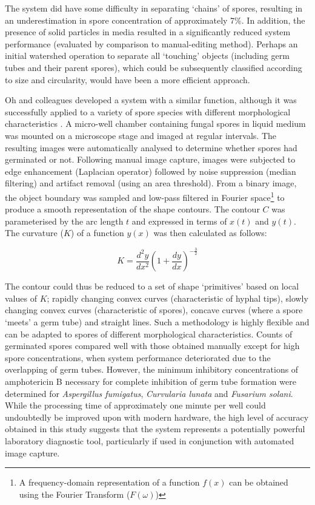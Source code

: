 The system did have some difficulty in separating \lq chains' of spores, resulting in an underestimation in spore concentration of approximately 7\%. In addition, the presence of solid particles in media resulted in a significantly reduced system performance (evaluated by comparison to manual-editing method). Perhaps an initial watershed operation to separate all \lq touching' objects (including germ tubes and their parent spores), which could be subsequently classified according to size and circularity, would have been a more efficient approach.

Oh and colleagues developed a system with a similar function, although it was successfully applied to a variety of spore species with different morphological characteristics \cite{oh1996}. A micro-well chamber containing fungal spores in liquid medium was mounted on a microscope stage and imaged at regular intervals. The resulting images were automatically analysed to determine whether spores had germinated or not. Following manual image capture, images were subjected to edge enhancement (Laplacian operator) followed by noise suppression (median filtering) and artifact removal (using an area threshold). From a binary image, the object boundary was sampled and low-pass filtered in Fourier space\footnote{A frequency-domain representation of a function $f(x)$ can be obtained using the Fourier Transform ($F(\omega)$)} to produce a smooth representation of the shape contours. The contour $C$ was parameterised by the arc length $t$ and expressed in terms of $x(t)$ and $y(t)$. The curvature ($K$) of a function $y(x)$ was then calculated as follows:

\begin{equation}
	K = \frac{d^2 y}{dx^2} \left (1 + \frac{dy}{dx} \right )^{-\frac{3}{2}}
\end{equation}

\noindent The contour could thus be reduced to a set of shape \lq primitives' based on local values of $K$; rapidly changing convex curves (characteristic of hyphal tips), slowly changing convex curves (characteristic of spores), concave curves (where a spore \lq meets' a germ tube) and straight lines. Such a methodology is highly flexible and can be adapted to spores of different morphological characteristics. Counts of germinated spores compared well with those obtained manually except for high spore concentrations, when system performance deteriorated due to the overlapping of germ tubes. However, the minimum inhibitory concentrations of amphotericin B necessary for complete inhibition of germ tube formation were determined for \emph{Aspergillus fumigatus}, \emph{Curvularia lunata} and \emph{Fusarium solani}. While the processing time of approximately one minute per well could undoubtedly be improved upon with modern hardware, the high level of accuracy obtained in this study suggests that the system represents a potentially powerful laboratory diagnostic tool, particularly if used in conjunction with automated image capture.

